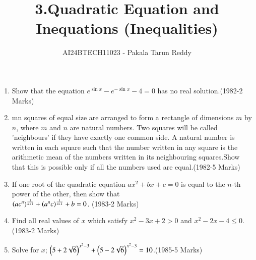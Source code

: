 \documentclass[journal,12pt,twocolumn]{IEEEtran}
\theoremstyle{remark}
\begin{document}

\vspace{3cm}

\title{3.Quadratic Equation and\\ Inequations (Inequalities)}
\author{AI24BTECH11023 - Pakala Tarun Reddy}
\maketitle
\begin{enumerate}[start=13]
\item Show that the equation $e^{\sin{x}}-e^{-\sin{x}}-4=0$ has no real solution.\hfill{(1982-2 Marks)}
\item mn squares of equal size are arranged to form a rectangle of dimensions $m$ by $n$, where $m$ and $n$ are natural numbers. Two squares will be called 'neighbours' if they have exactly one common side. A natural number is written in each square such that the number written in any square is the arithmetic mean of the numbers written in its neighbouring squares.Show that this is possible only if all the numbers used are equal.\hfill{(1982-5 Marks)}
\item {If one root of the quadratic equation $ax^2+bx+c=0$ is equal to the $n$-th power of the other, then show that\\
$\left(ac^n\right)^\frac{1}{n+1} +\left(a^nc\right)^\frac{1}{n+1}+b=0$. \hfill(1983-2 Marks)}
 \item {Find all real values of $x$ which satisfy $x^2-3x+2>0$ and $x^2-2x-4\leq 0$.\hfill{(1983-2 Marks)}}
 \item Solve for $x$; $\left(5+2\sqrt{6}\right)^{x^2-3}+\left(5-2\sqrt{6}\right)^{x^2-3}=10$.\hfill{(1985-5 Marks)}
 

\end{enumerate}
\end{document}
